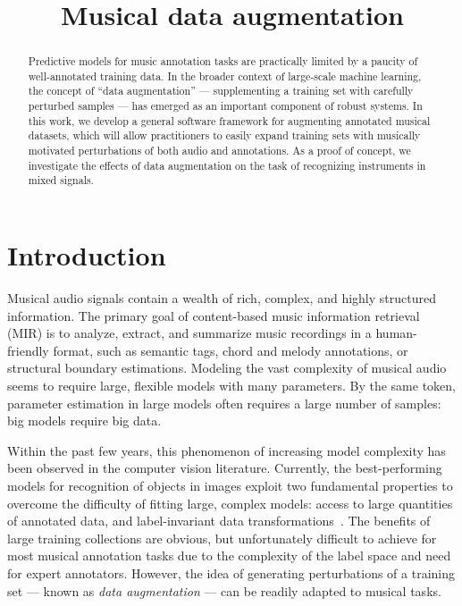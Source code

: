 \documentclass{article}
\title{Musical data augmentation}
\begin{document}
%
\maketitle
%
\begin{abstract}
Predictive models for music annotation tasks are practically limited by a paucity of
well-annotated training data.
In the broader context of large-scale machine learning, the concept of ``data
augmentation'' --- supplementing a training set with carefully perturbed samples ---
has emerged as an important component of robust systems.
In this work, we develop a general software framework for augmenting annotated
musical datasets, which will allow practitioners to easily expand training sets
with musically motivated perturbations of both audio and annotations.
As a proof of concept, we investigate the effects of data augmentation on
the task of recognizing instruments in mixed signals.
\end{abstract}
%
\section{Introduction}
\label{sec:introduction}


Musical audio signals contain a wealth of rich, complex, and highly structured
information.  The primary goal of content-based music information retrieval (MIR) is to
analyze, extract, and summarize music recordings in a human-friendly
format, such as semantic tags, chord and melody annotations, or structural boundary
estimations.  Modeling the vast complexity of musical audio seems to require large, 
flexible models with many parameters.
By the same token, parameter estimation in large models often requires
a large number of samples: big models require big data.

Within the past few years, this phenomenon of increasing model complexity has been 
observed in the computer vision literature.  Currently, the best-performing models for 
recognition of objects in images exploit two fundamental properties to overcome the 
difficulty of fitting large, complex models: access to large quantities of annotated data, 
and label-invariant data transformations~\cite{krizhevsky2012imagenet}.
The benefits of large training collections are obvious, but unfortunately difficult to
achieve for most musical annotation tasks due to the complexity of the label space and
need for expert annotators.  However, the idea of generating perturbations of a training
set --- known as \emph{data augmentation} --- can be readily adapted to musical tasks.
\end{document}
